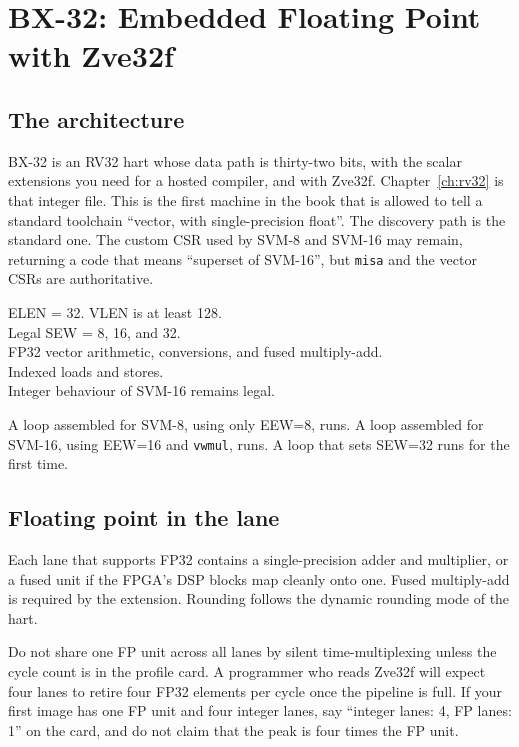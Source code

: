 \chapter{BX-32: Embedded Floating Point with Zve32f}
\label{ch:bx32}

\section{The architecture}

BX-32 is an RV32 hart whose data path is thirty-two bits, with the scalar extensions you need for a hosted compiler, and with Zve32f. Chapter~\ref{ch:rv32} is that integer file. This is the first machine in the book that is allowed to tell a standard toolchain ``vector, with single-precision float''. The discovery path is the standard one. The custom CSR used by SVM-8 and SVM-16 may remain, returning a code that means ``superset of SVM-16'', but \texttt{misa} and the vector CSRs are authoritative.

\begin{spec}
ELEN = 32. VLEN is at least 128.\\
Legal SEW = 8, 16, and 32.\\
FP32 vector arithmetic, conversions, and fused multiply-add.\\
Indexed loads and stores.\\
Integer behaviour of SVM-16 remains legal.
\end{spec}

A loop assembled for SVM-8, using only EEW=8, runs. A loop assembled for SVM-16, using EEW=16 and \texttt{vwmul}, runs. A loop that sets SEW=32 runs for the first time.

\section{Floating point in the lane}

Each lane that supports FP32 contains a single-precision adder and multiplier, or a fused unit if the FPGA's DSP blocks map cleanly onto one. Fused multiply-add is required by the extension. Rounding follows the dynamic rounding mode of the hart.

Do not share one FP unit across all lanes by silent time-multiplexing unless the cycle count is in the profile card. A programmer who reads Zve32f will expect four lanes to retire four FP32 elements per cycle once the pipeline is full. If your first image has one FP unit and four integer lanes, say ``integer lanes: 4, FP lanes: 1'' on the card, and do not claim that the peak is four times the FP unit.

